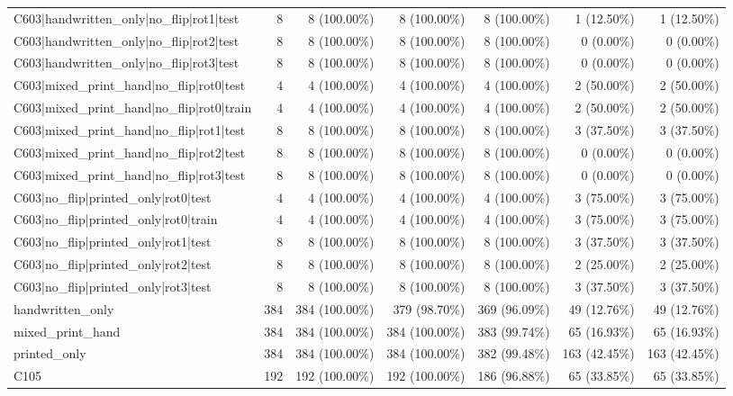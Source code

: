 \begin{longtable}{>{\raggedright\arraybackslash}p{5cm}rrrrrr}
C603|handwritten\_only|no\_flip|rot1|test & 8 & 8 (100.00\%) & 8 (100.00\%) & 8 (100.00\%) & 1 (12.50\%) & 1 (12.50\%) \\
C603|handwritten\_only|no\_flip|rot2|test & 8 & 8 (100.00\%) & 8 (100.00\%) & 8 (100.00\%) & 0 (0.00\%) & 0 (0.00\%) \\
C603|handwritten\_only|no\_flip|rot3|test & 8 & 8 (100.00\%) & 8 (100.00\%) & 8 (100.00\%) & 0 (0.00\%) & 0 (0.00\%) \\
C603|mixed\_print\_hand|no\_flip|rot0|test & 4 & 4 (100.00\%) & 4 (100.00\%) & 4 (100.00\%) & 2 (50.00\%) & 2 (50.00\%) \\
C603|mixed\_print\_hand|no\_flip|rot0|train & 4 & 4 (100.00\%) & 4 (100.00\%) & 4 (100.00\%) & 2 (50.00\%) & 2 (50.00\%) \\
C603|mixed\_print\_hand|no\_flip|rot1|test & 8 & 8 (100.00\%) & 8 (100.00\%) & 8 (100.00\%) & 3 (37.50\%) & 3 (37.50\%) \\
C603|mixed\_print\_hand|no\_flip|rot2|test & 8 & 8 (100.00\%) & 8 (100.00\%) & 8 (100.00\%) & 0 (0.00\%) & 0 (0.00\%) \\
C603|mixed\_print\_hand|no\_flip|rot3|test & 8 & 8 (100.00\%) & 8 (100.00\%) & 8 (100.00\%) & 0 (0.00\%) & 0 (0.00\%) \\
C603|no\_flip|printed\_only|rot0|test & 4 & 4 (100.00\%) & 4 (100.00\%) & 4 (100.00\%) & 3 (75.00\%) & 3 (75.00\%) \\
C603|no\_flip|printed\_only|rot0|train & 4 & 4 (100.00\%) & 4 (100.00\%) & 4 (100.00\%) & 3 (75.00\%) & 3 (75.00\%) \\
C603|no\_flip|printed\_only|rot1|test & 8 & 8 (100.00\%) & 8 (100.00\%) & 8 (100.00\%) & 3 (37.50\%) & 3 (37.50\%) \\
C603|no\_flip|printed\_only|rot2|test & 8 & 8 (100.00\%) & 8 (100.00\%) & 8 (100.00\%) & 2 (25.00\%) & 2 (25.00\%) \\
C603|no\_flip|printed\_only|rot3|test & 8 & 8 (100.00\%) & 8 (100.00\%) & 8 (100.00\%) & 3 (37.50\%) & 3 (37.50\%) \\
handwritten\_only & 384 & 384 (100.00\%) & 379 (98.70\%) & 369 (96.09\%) & 49 (12.76\%) & 49 (12.76\%) \\
mixed\_print\_hand & 384 & 384 (100.00\%) & 384 (100.00\%) & 383 (99.74\%) & 65 (16.93\%) & 65 (16.93\%) \\
printed\_only & 384 & 384 (100.00\%) & 384 (100.00\%) & 382 (99.48\%) & 163 (42.45\%) & 163 (42.45\%) \\
C105 & 192 & 192 (100.00\%) & 192 (100.00\%) & 186 (96.88\%) & 65 (33.85\%) & 65 (33.85\%) \\

\end{longtable}
